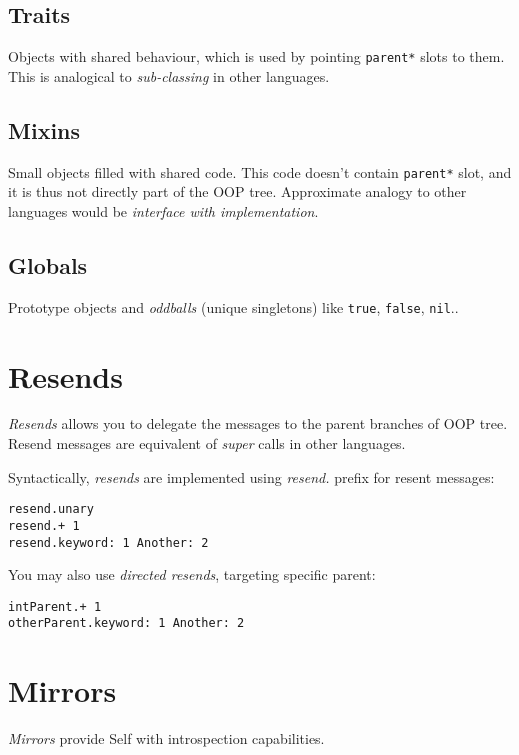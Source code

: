 \documentclass[10pt]{article}
\begin{document}
\begin{multicols*}{3}
\subsection{Traits}
Objects with shared behaviour, which is used by pointing \texttt{parent*} slots to them. This is analogical to \textit{sub-classing} in other languages.



\subsection{Mixins}

Small objects filled with shared code. This code doesn't contain \texttt{parent*} slot, and it is thus not directly part of the OOP tree. Approximate analogy to other languages would be \textit{interface with implementation}.



\subsection{Globals}
Prototype objects and \textit{oddballs} (unique singletons) like \texttt{true}, \texttt{false}, \texttt{nil}..




\section{Resends}

\textit{Resends} allows you to delegate the messages to the parent branches of OOP tree. Resend messages are equivalent of \textit{super} calls in other languages.

Syntactically, \textit{resends} are implemented using \textit{resend.} prefix for resent messages:

\begin{lstlisting}
resend.unary
resend.+ 1
resend.keyword: 1 Another: 2
\end{lstlisting}

You may also use \textit{directed resends}, targeting specific parent:

\begin{lstlisting}
intParent.+ 1
otherParent.keyword: 1 Another: 2
\end{lstlisting}




\section{Mirrors}
\textit{Mirrors} provide Self with introspection capabilities.


\end{multicols*}
\end{document}
